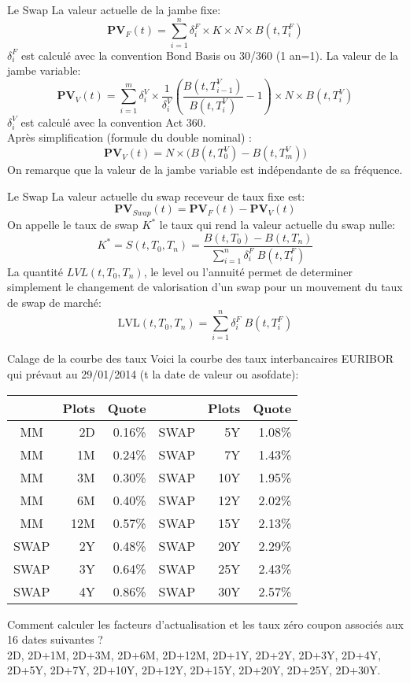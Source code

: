 \documentclass{beamer}
\begin{document}
\begin{frame}{Le Swap}
La valeur actuelle de la jambe fixe:
\[
\textbf{PV}_F(t) = \sum_{i=1}^{n}\delta_i^F \times K  \times  N  \times  B(t,T_i^F)
\]
$\delta_i^F$ est calculé avec la convention Bond Basis ou 30/360 (1 an=1).
La valeur de la jambe variable:
\[
\textbf{PV}_V(t) = \sum_{i=1}^{m}\delta_i^V \times \frac{1}{\delta_i^V}\left(\frac{B(t,T_{i-1}^V)}{B(t,T_i^V)}-1\right)  \times  N  \times  B(t,T_i^V)
\]
$\delta_i^V$ est calculé avec la convention Act 360.\\
Après simplification (formule du double nominal) :
\[
\textbf{PV}_V(t) = N \times \Big(B(t,T_0^V)-B(t,T_m^V)\Big)
\]
On remarque que la valeur de la jambe variable est indépendante de sa fréquence.
\end{frame}

\begin{frame}{Le Swap}
La valeur actuelle du swap receveur de taux fixe est:
\[
\textbf{PV}_{Swap}(t) = \textbf{PV}_F(t)-\textbf{PV}_V(t)
\]
On appelle le taux de swap $K^*$ le taux qui rend la valeur actuelle du swap nulle:
\[
K^*=S(t,T_0,T_n)=\frac{B(t,T_0)-B(t,T_n)}{ \sum_{i=1}^{n}\delta_i^F \;B(t,T_i^F)}
\]
La quantité ${LVL}(t,T_0,T_n)$, le level ou l'annuité permet de determiner simplement le changement de valorisation d'un swap pour un mouvement du taux de swap de marché:
\[
\text{LVL}(t,T_0,T_n)=  \sum_{i=1}^{n}\delta_i^F \;B(t,T_i^F)
\]
\end{frame}

\begin{frame}{Calage de la courbe des taux}
Voici la courbe des taux interbancaires EURIBOR qui prévaut au 29/01/2014 (t la date de valeur ou asofdate):

\begin{center}
\begin{tabular}{|c|r|r|c|r|r|}
  \hline
  & Plots & Quote & & Plots & Quote \\
  \hline
  MM & 2D & 0.16\% & SWAP & 5Y & 1.08\%\\
  MM & 1M & 0.24\% & SWAP & 7Y & 1.43\%\\
  MM & 3M & 0.30\% & SWAP & 10Y & 1.95\%\\
  MM & 6M & 0.40\% & SWAP & 12Y & 2.02\%\\
  MM & 12M & 0.57\% & SWAP & 15Y & 2.13\%\\
  SWAP & 2Y & 0.48\% & SWAP & 20Y & 2.29\%\\
  SWAP & 3Y & 0.64\% & SWAP & 25Y & 2.43\%\\
  SWAP & 4Y & 0.86\% & SWAP & 30Y & 2.57\%\\
  \hline
\end{tabular}
\end{center}
Comment calculer les facteurs d'actualisation et les taux zéro coupon associés aux 16 dates suivantes ? \\
2D, 2D+1M, 2D+3M, 2D+6M, 2D+12M, 2D+1Y, 2D+2Y, 2D+3Y, 2D+4Y, 2D+5Y, 2D+7Y, 2D+10Y, 2D+12Y, 2D+15Y, 2D+20Y, 2D+25Y, 2D+30Y.
\end{frame}
\end{document}

